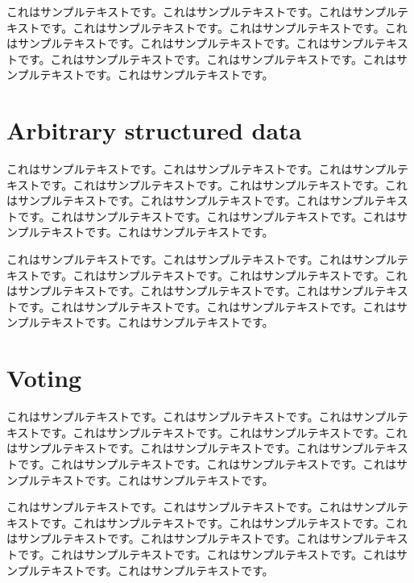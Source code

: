 \documentclass[a4paper, dvipdfmx]{jsarticle}
\begin{document}
これはサンプルテキストです。これはサンプルテキストです。これはサンプルテキストです。これはサンプルテキストです。これはサンプルテキストです。これはサンプルテキストです。これはサンプルテキストです。これはサンプルテキストです。これはサンプルテキストです。これはサンプルテキストです。これはサンプルテキストです。これはサンプルテキストです。

\section{Arbitrary structured data}
これはサンプルテキストです。これはサンプルテキストです。これはサンプルテキストです。これはサンプルテキストです。これはサンプルテキストです。これはサンプルテキストです。これはサンプルテキストです。これはサンプルテキストです。これはサンプルテキストです。これはサンプルテキストです。これはサンプルテキストです。これはサンプルテキストです。

これはサンプルテキストです。これはサンプルテキストです。これはサンプルテキストです。これはサンプルテキストです。これはサンプルテキストです。これはサンプルテキストです。これはサンプルテキストです。これはサンプルテキストです。これはサンプルテキストです。これはサンプルテキストです。これはサンプルテキストです。これはサンプルテキストです。

\section{Voting}
これはサンプルテキストです。これはサンプルテキストです。これはサンプルテキストです。これはサンプルテキストです。これはサンプルテキストです。これはサンプルテキストです。これはサンプルテキストです。これはサンプルテキストです。これはサンプルテキストです。これはサンプルテキストです。これはサンプルテキストです。これはサンプルテキストです。

これはサンプルテキストです。これはサンプルテキストです。これはサンプルテキストです。これはサンプルテキストです。これはサンプルテキストです。これはサンプルテキストです。これはサンプルテキストです。これはサンプルテキストです。これはサンプルテキストです。これはサンプルテキストです。これはサンプルテキストです。これはサンプルテキストです。
\end{document}
